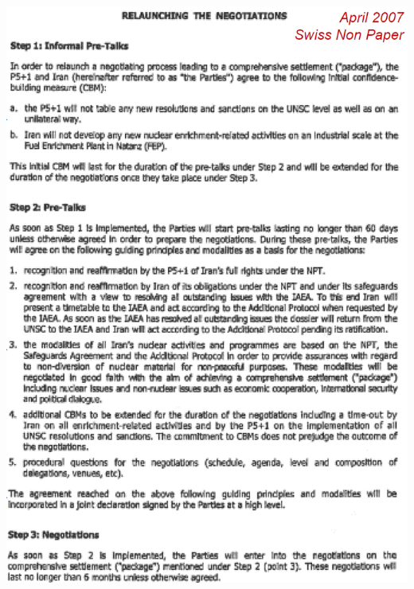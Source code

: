 \begin{minipage}{0.5\textwidth}
    \centering
    \includegraphics[width=\textwidth]{Pictures/Swiss_nonpaper.png}
\end{minipage}

